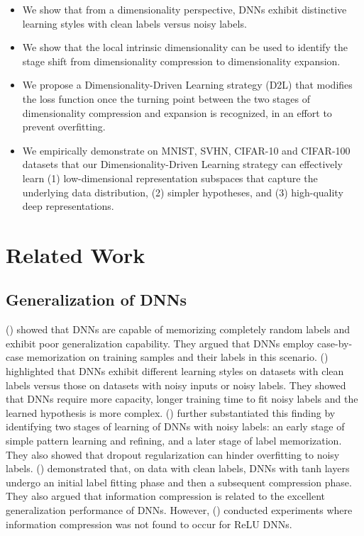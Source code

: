 \documentclass{article}
\begin{document}
\begin{itemize}
  \item We show that from a dimensionality perspective, DNNs exhibit distinctive learning styles with clean labels versus noisy labels.
  
  \item We show that the local intrinsic dimensionality can be used to identify the stage shift from dimensionality compression to dimensionality expansion.
  
  \item We propose a Dimensionality-Driven Learning strategy (D2L) that modifies the loss function once the turning point between the two stages of dimensionality compression and expansion is recognized, in an effort to prevent overfitting.
  
  \item We empirically demonstrate on MNIST, SVHN, CIFAR-10 and CIFAR-100 datasets that our Dimensionality-Driven Learning strategy can effectively learn (1) low-dimensional representation subspaces that capture the underlying data distribution, (2) simpler hypotheses, and (3) high-quality deep representations.
\end{itemize}

\section{Related Work}
\label{sec:related}


\subsection{Generalization of DNNs}
\citeauthor{zhang2016understanding} (\citeyear{zhang2016understanding}) showed that DNNs are capable of memorizing completely random labels and exhibit poor generalization capability. They argued that DNNs employ case-by-case memorization on training samples and their labels in this scenario.
\citeauthor{krueger2017deep} (\citeyear{krueger2017deep}) highlighted that DNNs exhibit different learning styles on datasets with clean labels versus those on datasets with noisy inputs or noisy labels. They showed that DNNs require more capacity, longer training time to fit noisy labels and the learned hypothesis is more complex. \citeauthor{arpit2017closer} (\citeyear{arpit2017closer}) further substantiated this finding by identifying two stages of learning of DNNs with noisy labels: an early stage of simple pattern learning and refining, and a later stage of label memorization. They also showed that dropout regularization can hinder overfitting to noisy labels. \citeauthor{shwartz2017opening} (\citeyear{shwartz2017opening}) demonstrated that, on data with clean labels, DNNs with tanh layers undergo an initial label fitting phase and then a subsequent compression phase. They also argued that information compression is related to the excellent generalization performance of DNNs. However, \citeauthor{michael2018on} (\citeyear{michael2018on}) conducted experiments where information compression was not found to occur for ReLU \cite{glorot2011deep} DNNs.
\end{document}
